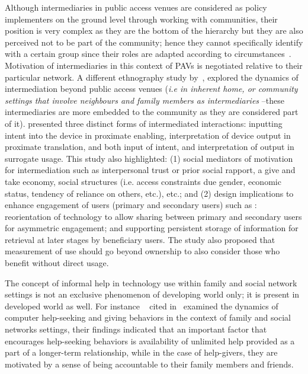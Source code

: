 Although intermediaries in public access venues are considered as policy implementers on the ground level through working with communities, their position is very complex as they are the bottom of the hierarchy but they are also perceived not to be part of the community; hence they cannot specifically identify with a certain group since their roles are adapted according to circumstances~\citep{bailur2010liminal}. Motivation of intermediaries in this context of PAVs is negotiated relative to their particular network. A different ethnography study by~\cite{sambasivan2010}, explored the dynamics of intermediation beyond public access venues (\emph{i.e in inherent home, or community settings that involve neighbours and family members as intermediaries} --these intermediaries are more embedded to the community as they are considered part of it). \cite{sambasivan2010} presented three distinct forms of intermediated interactions: inputting intent into the device in proximate enabling, interpretation of device output in proximate translation, and both input of intent, and interpretation of output in surrogate usage. This study also highlighted: (1) social mediators of motivation for intermediation such as interpersonal trust or prior social rapport, a give and take economy, social structures (i.e. access constraints due gender, economic status, tendency of reliance on others, etc.), etc.; and (2) design implications to enhance engagement of users (primary and secondary users) such as : reorientation of technology  to allow sharing between primary and secondary users for asymmetric engagement; and supporting persistent storage of information for retrieval at later stages by beneficiary users. The study also proposed that measurement of use should go beyond ownership to also consider those who benefit without direct usage. 

The concept of informal help in technology use within family and social network settings is not an exclusive  phenomenon of developing world only; it is present in developed world as well. For instance ~\cite{poole:chh} cited in~\cite{katule2016leveraging} examined the dynamics of computer help-seeking and giving behaviors in the context of family and social networks settings, their findings indicated that an important factor that  encourages help-seeking behaviors is availability of unlimited help provided as a part of a longer-term relationship, while in the case of help-givers, they are motivated by a sense of being accountable to their family members and friends.

